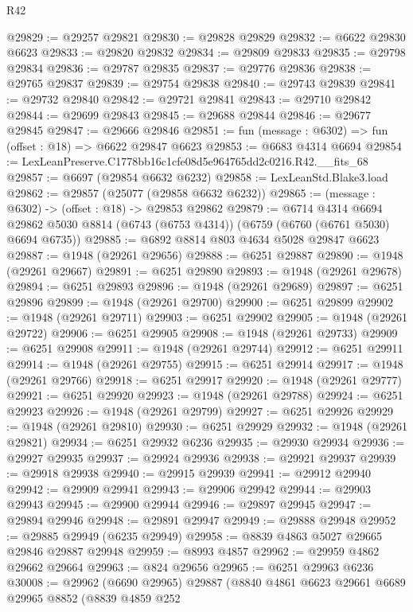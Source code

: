 \begin{lexlean}{R42}
\begin{coremodule}
{@29829 := @29257 @29821
@29830 := @29828 @29829
@29832 := @6622 @29830 @6623
@29833 := @29820 @29832
@29834 := @29809 @29833
@29835 := @29798 @29834
@29836 := @29787 @29835
@29837 := @29776 @29836
@29838 := @29765 @29837
@29839 := @29754 @29838
@29840 := @29743 @29839
@29841 := @29732 @29840
@29842 := @29721 @29841
@29843 := @29710 @29842
@29844 := @29699 @29843
@29845 := @29688 @29844
@29846 := @29677 @29845
@29847 := @29666 @29846
@29851 := fun (message : @6302) => fun (offset : @18) => @6622 @29847 @6623
@29853 := @6683 @4314 @6694
@29854 := LexLeanPreserve.C1778bb16c1cfe08d5e964765dd2c0216.R42.__fits_68
@29857 := @6697 (@29854 @6632 @6232)
@29858 := LexLeanStd.Blake3.load
@29862 := @29857 (@25077 (@29858 @6632 @6232))
@29865 := (message : @6302) -> (offset : @18) -> @29853 @29862
@29879 := @6714
    @4314
    @6694
    @29862
    @5030
    @8814
    (@6743 (@6753 @4314))
    (@6759 (@6760 (@6761 @5030) @6694 @6735))
@29885 := @6892 @8814 @803 @4634 @5028 @29847 @6623
@29887 := @1948 (@29261 @29656)
@29888 := @6251 @29887
@29890 := @1948 (@29261 @29667)
@29891 := @6251 @29890
@29893 := @1948 (@29261 @29678)
@29894 := @6251 @29893
@29896 := @1948 (@29261 @29689)
@29897 := @6251 @29896
@29899 := @1948 (@29261 @29700)
@29900 := @6251 @29899
@29902 := @1948 (@29261 @29711)
@29903 := @6251 @29902
@29905 := @1948 (@29261 @29722)
@29906 := @6251 @29905
@29908 := @1948 (@29261 @29733)
@29909 := @6251 @29908
@29911 := @1948 (@29261 @29744)
@29912 := @6251 @29911
@29914 := @1948 (@29261 @29755)
@29915 := @6251 @29914
@29917 := @1948 (@29261 @29766)
@29918 := @6251 @29917
@29920 := @1948 (@29261 @29777)
@29921 := @6251 @29920
@29923 := @1948 (@29261 @29788)
@29924 := @6251 @29923
@29926 := @1948 (@29261 @29799)
@29927 := @6251 @29926
@29929 := @1948 (@29261 @29810)
@29930 := @6251 @29929
@29932 := @1948 (@29261 @29821)
@29934 := @6251 @29932 @6236
@29935 := @29930 @29934
@29936 := @29927 @29935
@29937 := @29924 @29936
@29938 := @29921 @29937
@29939 := @29918 @29938
@29940 := @29915 @29939
@29941 := @29912 @29940
@29942 := @29909 @29941
@29943 := @29906 @29942
@29944 := @29903 @29943
@29945 := @29900 @29944
@29946 := @29897 @29945
@29947 := @29894 @29946
@29948 := @29891 @29947
@29949 := @29888 @29948
@29952 := @29885 @29949 (@6235 @29949)
@29958 := @8839 @4863 @5027 @29665 @29846 @29887 @29948
@29959 := @8993 @4857
@29962 := @29959 @4862 @29662 @29664
@29963 := @824 @29656
@29965 := @6251 @29963 @6236
@30008 := @29962
    (@6690 @29965)
    @29887
    (@8840
      @4861
      @6623
      @29661
      @6689
      @29965
      @8852
      (@8839
        @4859
        @252
}
\end{coremodule}
\end{lexlean}
